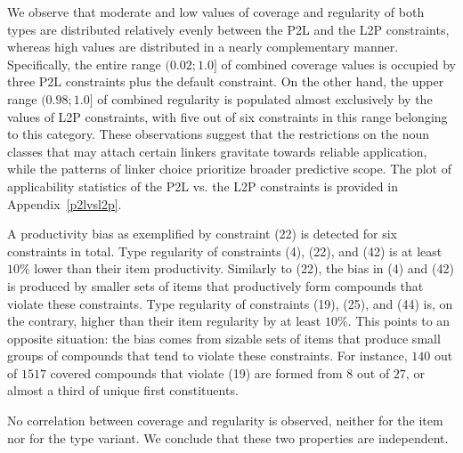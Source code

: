 \documentclass[10pt, a4paper]{article}
\begin{document}
We observe that moderate and low values of coverage and regularity of both types are distributed relatively evenly between the P2L and the L2P constraints, whereas high values are distributed in a nearly complementary manner. Specifically, the entire range $(0.02; 1.0]$ of combined coverage values is occupied by three P2L constraints plus the default constraint. On the other hand, the upper range $(0.98; 1.0]$ of combined regularity is populated almost exclusively by the values of L2P constraints, with five out of six constraints in this range belonging to this category. These observations suggest that the restrictions on the noun classes that may attach certain linkers gravitate towards reliable application, while the patterns of linker choice prioritize broader predictive scope. The plot of applicability statistics of the P2L vs. the L2P constraints is provided in Appendix~\ref{p2lvsl2p}.

A productivity bias as exemplified by constraint (22) is detected for six constraints in total. Type regularity of constraints (4), (22), and (42) is at least $10\%$ lower than their item productivity. Similarly to (22), the bias in (4) and (42) is produced by smaller sets of items that productively form compounds that violate these constraints. Type regularity of constraints (19), (25), and (44) is, on the contrary, higher than their item regularity by at least $10\%$. This points to an opposite situation: the bias comes from sizable sets of items that produce small groups of compounds that tend to violate these constraints. For instance, $140$ out of $1517$ covered compounds that violate (19) are formed from $8$ out of $27$, or almost a third of unique first constituents.

No correlation between coverage and regularity is observed, neither for the item nor for the type variant. We conclude that these two properties are independent.

\end{document}
